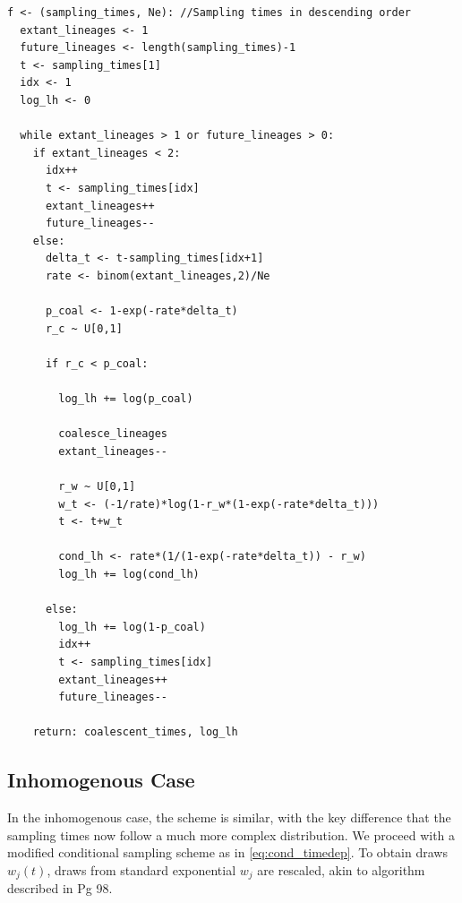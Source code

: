 \documentclass{report}
\theoremstyle{definition}
\begin{document}
\begin{lstlisting}
f <- (sampling_times, Ne): //Sampling times in descending order
  extant_lineages <- 1
  future_lineages <- length(sampling_times)-1
  t <- sampling_times[1]
  idx <- 1
  log_lh <- 0

  while extant_lineages > 1 or future_lineages > 0:
    if extant_lineages < 2:
      idx++
      t <- sampling_times[idx]
      extant_lineages++
      future_lineages--
    else:
      delta_t <- t-sampling_times[idx+1]
      rate <- binom(extant_lineages,2)/Ne

      p_coal <- 1-exp(-rate*delta_t)
      r_c ~ U[0,1] 

      if r_c < p_coal:

        log_lh += log(p_coal)

        coalesce_lineages
        extant_lineages--

        r_w ~ U[0,1]
        w_t <- (-1/rate)*log(1-r_w*(1-exp(-rate*delta_t)))
        t <- t+w_t

        cond_lh <- rate*(1/(1-exp(-rate*delta_t)) - r_w)
        log_lh += log(cond_lh)

      else:
        log_lh += log(1-p_coal)
        idx++
        t <- sampling_times[idx]
        extant_lineages++
        future_lineages--

    return: coalescent_times, log_lh
\end{lstlisting}
\subsection{Inhomogenous Case}
In the inhomogenous case, the scheme is similar, with the key difference that the sampling times now follow a much more complex distribution. We proceed with a modified conditional sampling scheme as in \ref{eq:cond_timedep}. To obtain draws $w_j(t)$, draws from standard exponential $w_j$ are rescaled, akin to algorithm described in \cite{hein_gene_2004} Pg 98.
\end{document}
